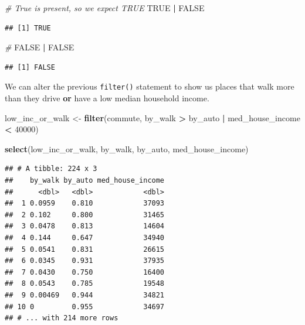 \documentclass[
]{book}
\newenvironment{Shaded}{\begin{snugshade}}{\end{snugshade}}
\newcommand{\CommentTok}[1]{\textcolor[rgb]{0.56,0.35,0.01}{\textit{#1}}}
\newcommand{\DecValTok}[1]{\textcolor[rgb]{0.00,0.00,0.81}{#1}}
\newcommand{\KeywordTok}[1]{\textcolor[rgb]{0.13,0.29,0.53}{\textbf{#1}}}
\newcommand{\NormalTok}[1]{#1}
\newcommand{\OperatorTok}[1]{\textcolor[rgb]{0.81,0.36,0.00}{\textbf{#1}}}
\newcommand{\OtherTok}[1]{\textcolor[rgb]{0.56,0.35,0.01}{#1}}
\newcommand{\StringTok}[1]{\textcolor[rgb]{0.31,0.60,0.02}{#1}}
\begin{document}
\begin{Shaded}
\begin{Highlighting}[]
\CommentTok{\# True is present, so we expect TRUE}
\OtherTok{TRUE} \OperatorTok{|}\StringTok{ }\OtherTok{FALSE}
\end{Highlighting}
\end{Shaded}

\begin{verbatim}
## [1] TRUE
\end{verbatim}

\begin{Shaded}
\begin{Highlighting}[]
\CommentTok{\# }
\OtherTok{FALSE} \OperatorTok{|}\StringTok{ }\OtherTok{FALSE}
\end{Highlighting}
\end{Shaded}

\begin{verbatim}
## [1] FALSE
\end{verbatim}

We can alter the previous \texttt{filter()} statement to show us places that walk more than they drive \textbf{or} have a low median household income.

\begin{Shaded}
\begin{Highlighting}[]
\NormalTok{low\_inc\_or\_walk \textless{}{-}}\StringTok{ }\KeywordTok{filter}\NormalTok{(commute,}
\NormalTok{                          by\_walk }\OperatorTok{\textgreater{}}\StringTok{ }\NormalTok{by\_auto }\OperatorTok{|}\StringTok{ }\NormalTok{med\_house\_income }\OperatorTok{\textless{}}\StringTok{ }\DecValTok{40000}\NormalTok{)}

\KeywordTok{select}\NormalTok{(low\_inc\_or\_walk, by\_walk, by\_auto, med\_house\_income)}
\end{Highlighting}
\end{Shaded}

\begin{verbatim}
## # A tibble: 224 x 3
##    by_walk by_auto med_house_income
##      <dbl>   <dbl>            <dbl>
##  1 0.0959    0.810            37093
##  2 0.102     0.800            31465
##  3 0.0478    0.813            14604
##  4 0.144     0.647            34940
##  5 0.0541    0.831            26615
##  6 0.0345    0.931            37935
##  7 0.0430    0.750            16400
##  8 0.0543    0.785            19548
##  9 0.00469   0.944            34821
## 10 0         0.955            34697
## # ... with 214 more rows
\end{verbatim}
\end{document}
